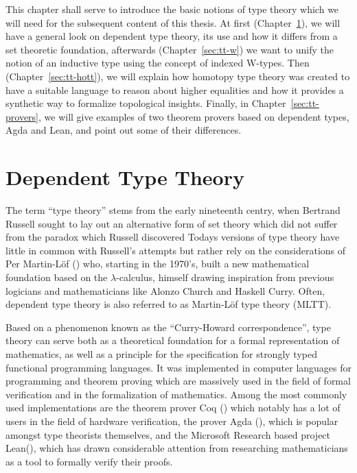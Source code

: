 This chapter shall serve to introduce the basic notions of type theory which
we will need for the subsequent content of this thesis.
At first (Chapter~\ref{sec:tt-dtt}), we will have a general look on dependent type theory, its use and
how it differs from a set theoretic foundation,
afterwards (Chapter~\ref{sec:tt-w}) we want to unify the notion of an inductive
type using the concept of indexed W-types.
Then (Chapter~\ref{sec:tt-hott}), we will explain how homotopy type theory was created to have a suitable
language to reason about higher equalities and how it provides a synthetic way to
formalize topological insights.
Finally, in Chapter~\ref{sec:tt-provers}, we will give examples of two theorem
provers based on dependent types, Agda and Lean, and point out some of their differences.

\section{Dependent Type Theory}\label{sec:tt-dtt}

The term ``type theory'' stems from the early nineteenth centry, when
Bert\-rand Russell sought to lay out an alternative form of set theory which did not
suffer from the paradox which Russell discovered
Todays versions of type theory have little in common with Russell's attempts
but rather rely on the considerations of Per Martin-Löf (\cite{martin-lof2, martin-lof1})
who, starting in the 1970's, built a new mathematical foundation based on the
$\lambda$-calculus, himself drawing inspiration from previous logicians and
mathematicians like Alonzo Church and Haskell Curry.
Often, dependent type theory is also referred to as Martin-Löf type theory (MLTT).

Based on a phenomenon known as the ``Curry-Howard corres\-pon\-dence'', type theory
can serve both as a theoretical foundation for a formal representation of mathematics,
as well as a principle for the specification for strongly typed functional
programming languages.
It was implemented in computer languages for programming and theorem proving which
are massively used in the field of formal verification and in the formalization of
mathematics.
Among the most commonly used implementations are the theorem prover Coq (\cite{coq})
which notably has a lot of users in the field of hardware verification,
the prover Agda (\cite{agda}), which is popular amongst type theorists themselves,
and the Microsoft Research based project Lean(\cite{mouracade}), which has
drawn considerable attention from researching mathematicians as a tool to
formally verify their proofs.

